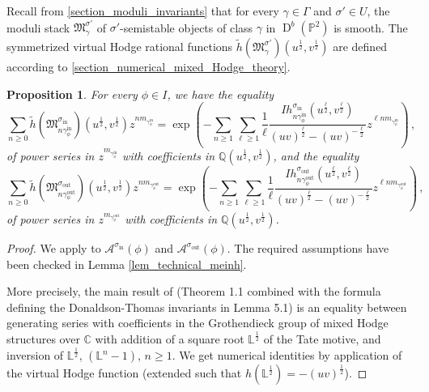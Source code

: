 \documentclass[12pt, a4paper]{amsart}
\newtheorem{prop}[defn]{Proposition}
\newcommand\C{\mathbb C}
\newcommand\PP{\mathbb P}
\newcommand\Q{\mathbb Q}
\newcommand\cA{\mathcal A}
\newcommand\fM{\mathfrak M}
\newcommand\D{\operatorname{D}}
\newcommand\iin{\mathrm{in}}
\newcommand\oout{\mathrm{out}}
\begin{document}
Recall from \cref{section_moduli_invariants} that for every 
$\gamma \in \Gamma$ and 
$\sigma' \in U$, the moduli stack 
$\fM_\gamma^{\sigma'}$ of 
$\sigma'$-semistable objects of class 
$\gamma$ in $\D^b(\PP^2)$ is smooth. 
The symmetrized virtual Hodge rational functions 
$\tilde{h}(\fM_\gamma^{\sigma'})(u^{\frac{1}{2}},v^{\frac{1}{2}})$ are defined according to \cref{section_numerical_mixed_Hodge_theory}.



\begin{prop}\label{prop_dt_ic}
For every $\phi \in I$,
we have the equality
\[\sum_{n\geqslant 0}
\tilde{h}(\fM_{n\gamma^\iin_\phi}^{\sigma_{\iin}})(u^{\frac{1}{2}},v^{\frac{1}{2}})
z^{nm_{\gamma^\iin_\phi}}= \exp
\left(-\sum_{n \geqslant 1} 
\sum_{\ell \geqslant 1} \frac{1}{\ell}
\frac{Ih_{n\gamma^\iin_\phi}^{\sigma_{\iin}}(u^{\frac{\ell}{2}}, v^{\frac{\ell}{2}})}{(uv)^{\frac{\ell}{2}}-(uv)^{-\frac{\ell}{2}}} 
z^{\ell n m_{\gamma^\iin_\phi}} \right) \,,\]
of power series in $z^{m_{\gamma^\iin_\phi}}$ with coefficients in 
$\Q(u^{\frac{1}{2}}, v^{\frac{1}{2}})$,
and the equality
\[\sum_{n \geqslant 0}
\tilde{h}(\fM_{n\gamma^\oout_\phi}^{\sigma_{\oout}})(u^{\frac{1}{2}},v^{\frac{1}{2}})
z^{n m_{\gamma^\oout_\phi}} = \exp
\left(-\sum_{n \geqslant 1} \sum_{\ell \geqslant 1} 
\frac{1}{\ell}
\frac{
Ih_{n\gamma^\oout_\phi}^{\sigma_{\oout}}(u^{\frac{\ell}{2}}, v^{\frac{\ell}{2}})}{(uv)^{\frac{\ell}{2}}-(uv)^{-\frac{\ell}{2}}} 
z^{\ell n m_{\gamma^\oout_\phi}} \right) \,,\]
of power series in $z^{m_{\gamma^\oout_\phi}}$ with coefficients in 
$\Q(u^{\frac{1}{2}}, v^{\frac{1}{2}})$.
\end{prop}

\begin{proof}
We apply 
\cite[Theorem 1.1]{meinhardt2015donaldson} to 
$\cA^{\sigma_{\iin}}(\phi)$ and $\cA^{\sigma_{\oout}}(\phi)$.
The required assumptions have been checked in Lemma \ref{lem_technical_meinh}.

More precisely, the main result of \cite{meinhardt2015donaldson}
(Theorem 1.1 combined with the formula defining the Donaldson-Thomas invariants in 
Lemma 5.1) is an equality between generating series with coefficients 
in the Grothendieck group of mixed Hodge structures over $\C$ 
with addition of a square root 
$\mathbb{L}^{\frac{1}{2}}$ of the Tate motive, and inversion of 
$\mathbb{L}^{\frac{1}{2}}$, 
$(\mathbb{L}^n-1)$, $n \geqslant 1$.
We get numerical identities by application of the virtual Hodge function (extended such that $h(\mathbb{L}^{\frac{1}{2}})=-(uv)^{\frac{1}{2}}$).
\end{proof}
\end{document}
